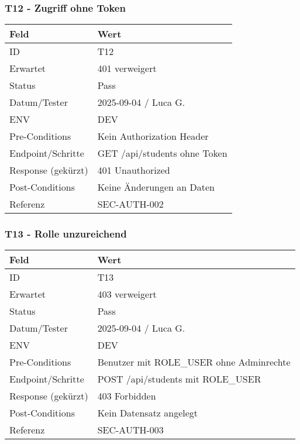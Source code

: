 \documentclass[12pt,a4paper]{article}
\begin{document}
    \subsubsection{T12 - Zugriff ohne Token}
    {\small
        \begin{tabularx}{\textwidth}{|p{3.2cm}|X|}
            \hline
            \textbf{Feld} & \textbf{Wert} \\ \hline
            ID & T12 \\ \hline
            Erwartet & 401 verweigert \\ \hline
            Status & Pass \\ \hline
            Datum/Tester & 2025-09-04 / Luca G. \\ \hline
            ENV & DEV \\ \hline
            Pre-Conditions & Kein Authorization Header \\ \hline
            Endpoint/Schritte & GET /api/students ohne Token \\ \hline
            Response (gekürzt) & 401 Unauthorized \\ \hline
            Post-Conditions & Keine Änderungen an Daten \\ \hline
            Referenz & SEC-AUTH-002 \\ \hline
        \end{tabularx}
    }

    \subsubsection{T13 - Rolle unzureichend}
    {\small
        \begin{tabularx}{\textwidth}{|p{3.2cm}|X|}
            \hline
            \textbf{Feld} & \textbf{Wert} \\ \hline
            ID & T13 \\ \hline
            Erwartet & 403 verweigert \\ \hline
            Status & Pass \\ \hline
            Datum/Tester & 2025-09-04 / Luca G. \\ \hline
            ENV & DEV \\ \hline
            Pre-Conditions & Benutzer mit ROLE_USER ohne Adminrechte \\ \hline
            Endpoint/Schritte & POST /api/students mit ROLE_USER \\ \hline
            Response (gekürzt) & 403 Forbidden \\ \hline
            Post-Conditions & Kein Datensatz angelegt \\ \hline
            Referenz & SEC-AUTH-003 \\ \hline
        \end{tabularx}
    }
\end{document}
